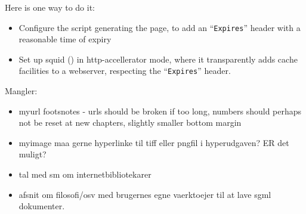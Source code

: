 \documentclass[11pt,ddraft,a4paper]{report}
\begin{document}
Here is one way to do it:

\begin{itemize}
\item Configure the script generating the page, to add an
  ``\texttt{Expires}'' header with a reasonable time of expiry
\item Set up squid () in http-accellerator mode, where
  it transparently adds cache facilities to a webserver, respecting
  the ``\texttt{Expires}'' header.
\end{itemize}


Mangler:

\begin{itemize}
\item myurl footsnotes - urls should be broken if too long, numbers
  should perhaps not be reset at new chapters, slightly smaller bottom
  margin 
  
  
  
\item myimage maa gerne hyperlinke til tiff eller pngfil i
  hyperudgaven?  ER det muligt?
\item tal med sm om internetbibliotekarer
\item afsnit om filosofi/osv med brugernes egne vaerktoejer til at
  lave sgml dokumenter.

  
\end{itemize}
\end{document}
